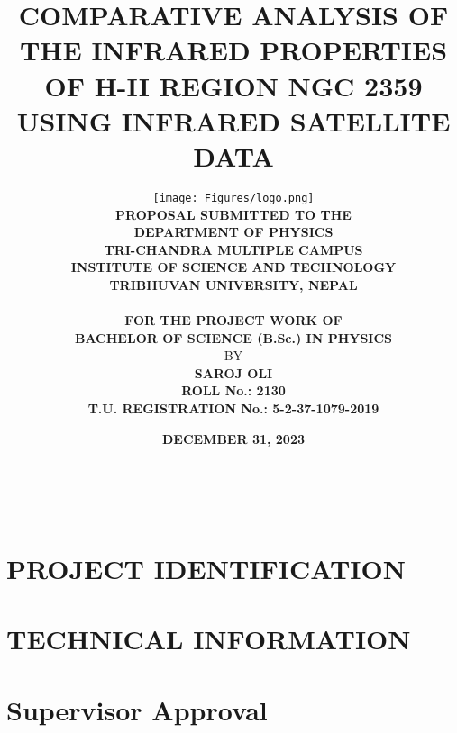 \documentclass[12pt]{article}
\begin{document}
\begin{titlepage}
\title{\bf COMPARATIVE ANALYSIS OF THE INFRARED PROPERTIES OF H-II REGION NGC 2359 USING INFRARED SATELLITE DATA}
\author{
{\texttt{[image: Figures/logo.png]}}
\\
\textbf{PROPOSAL SUBMITTED TO THE}\\		
\textbf{DEPARTMENT OF PHYSICS}\\
\textbf{TRI-CHANDRA MULTIPLE CAMPUS}\\
\textbf{INSTITUTE OF SCIENCE AND TECHNOLOGY}\\
\textbf{TRIBHUVAN UNIVERSITY, NEPAL}\\\\
\textbf{FOR THE PROJECT WORK OF}\\
\textbf{BACHELOR OF SCIENCE (B.Sc.) IN PHYSICS}\\
BY\\
\textbf{SAROJ OLI} \\
\textbf{ROLL No.: 2130}\\
\textbf{T.U. REGISTRATION No.: 5-2-37-1079-2019}}\\
{\date{\textbf{DECEMBER 31, 2023}}}
\setlength{\textheight}{23.5cm}
\maketitle
\thispagestyle{empty}
\setlength{\textheight}{23cm}
\end{titlepage}

\clearpage
{}


\newpage
\tableofcontents
\newpage
{}
\setcounter{page}{1}

\section{PROJECT IDENTIFICATION}

\section{TECHNICAL INFORMATION}





\begin{appendix}

\end{appendix}

\section{Supervisor Approval}

\end{document}
